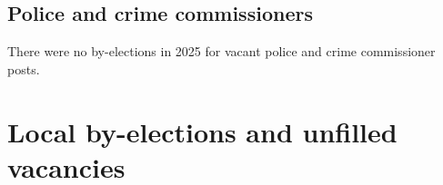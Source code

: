 \documentclass[a4paper,openany]{book}
\begin{document}
\section{Police and crime commissioners}

There were no by-elections in 2025 for vacant police and crime commissioner posts.

%
%
%
%

\chapter{Local by-elections and unfilled vacancies}
\end{document}

